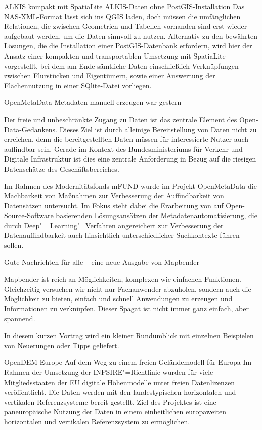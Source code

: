 %
{ALKIS kompakt mit SpatiaLite}%
{ALKIS-Daten ohne PostGIS-Installation}%
{
Das NAS-XML-Format lässt sich ins QGIS laden, doch müssen die umfänglichen Relationen, die zwischen
Geometrien und Tabellen vorhanden sind erst wieder aufgebaut werden, um die Daten sinnvoll zu
nutzen.
Alternativ zu den bewährten Lösungen, die die Installation einer PostGIS-Datenbank
erfordern, wird hier der Ansatz einer kompakten und transportablen Umsetzung mit SpatiaLite
vorgestellt, bei dem am Ende sämtliche Daten einschließlich Verknüpfungen zwischen Flurstücken und
Ei\-gen\-tü\-mern, sowie einer Auswertung der Flä\-chen\-nut\-zung in einer SQlite-Datei vorliegen.%
}

%
{OpenMetaData}%
{Metadaten manuell erzeugen war gestern}%
{
Der freie und unbeschränkte Zugang zu Daten ist das zentrale Element des Open-Data-Gedankens. Dieses
Ziel ist durch alleinige Bereitstellung von Daten nicht zu erreichen, denn die bereitgestellten
Daten müssen für interessierte Nutzer auch auffindbar sein. Gerade im Kontext des Bundesministeriums
für Verkehr und Digitale Infrastruktur ist dies eine zentrale Anforderung in Bezug auf die riesigen
Datenschätze des Geschäftsbereiches.

Im Rahmen des Modernitätsfonds mFUND wurde im Projekt OpenMetaData die Machbarkeit von Maßnahmen zur
Verbesserung der Auffindbarkeit von Datensätzen untersucht. Im Fokus steht dabei die Erarbeitung von
auf Open-Source-Software basierenden Lösungsansätzen der Metadatenautomatisierung, die durch Deep"=
Learning"=Verfahren angereichert zur Verbesserung der Datenauffindbarkeit auch hinsichtlich
unterschiedlicher Suchkontexte führen sollen.
}

%
{Gute Nachrichten für alle -- eine neue Ausgabe von Mapbender}%
{}%
{
Mapbender ist reich an Möglichkeiten, komplexen wie einfachen
Funktionen. Gleichzeitig versuchen wir nicht nur
Fachanwender abzuholen, sondern auch die Möglichkeit zu bieten, einfach und
schnell Anwendungen zu erzeugen und Informationen zu verknüpfen. Dieser
Spagat ist nicht immer ganz einfach, aber spannend.

In diesem kurzen Vortrag wird ein kleiner Rundumblick mit einzelnen
Beispielen von Neuerungen oder Tipps geliefert.%
}

%
{OpenDEM Europe}%
{Auf dem Weg zu einem freien Geländemodell für Europa}%
{
Im Rahmen der Umsetzung der INPSIRE"=Richtlinie wurden für viele Mitgliedsstaaten der EU
digitale Höhenmodelle unter freien Datenlizenzen veröffentlicht. Die Daten werden mit den
landestypischen horizontalen und vertikalen Referenzsysteme bereit gestellt. Ziel des Projektes ist
eine paneuropäische Nutzung der Daten in einem einheitlichen europaweiten horizontalen und
vertikalen Referenzsystem zu ermöglichen.%
}

